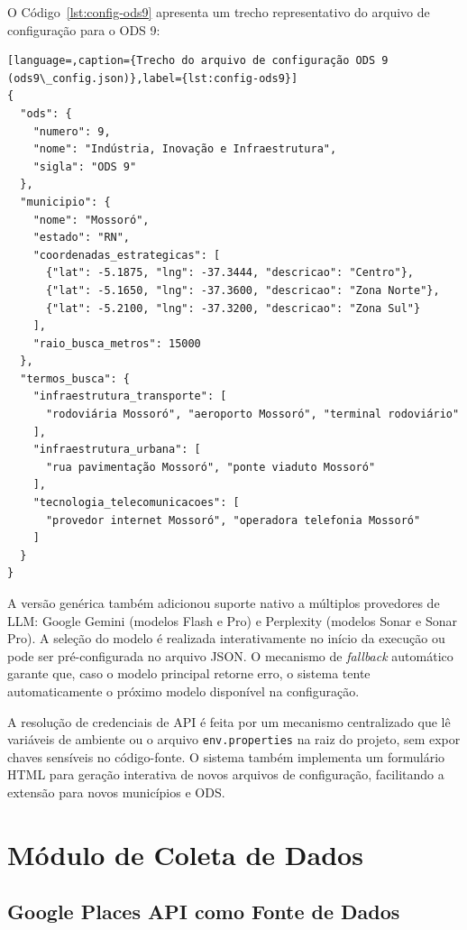 O Código~\ref{lst:config-ods9} apresenta um trecho representativo do arquivo de configuração para o ODS 9:

\begin{lstlisting}[language=,caption={Trecho do arquivo de configuração ODS 9 (ods9\_config.json)},label={lst:config-ods9}]
{
  "ods": {
    "numero": 9,
    "nome": "Indústria, Inovação e Infraestrutura",
    "sigla": "ODS 9"
  },
  "municipio": {
    "nome": "Mossoró",
    "estado": "RN",
    "coordenadas_estrategicas": [
      {"lat": -5.1875, "lng": -37.3444, "descricao": "Centro"},
      {"lat": -5.1650, "lng": -37.3600, "descricao": "Zona Norte"},
      {"lat": -5.2100, "lng": -37.3200, "descricao": "Zona Sul"}
    ],
    "raio_busca_metros": 15000
  },
  "termos_busca": {
    "infraestrutura_transporte": [
      "rodoviária Mossoró", "aeroporto Mossoró", "terminal rodoviário"
    ],
    "infraestrutura_urbana": [
      "rua pavimentação Mossoró", "ponte viaduto Mossoró"
    ],
    "tecnologia_telecomunicacoes": [
      "provedor internet Mossoró", "operadora telefonia Mossoró"
    ]
  }
}
\end{lstlisting}

A versão genérica também adicionou suporte nativo a múltiplos provedores de \gls{LLM}: Google Gemini (modelos Flash e Pro) e Perplexity (modelos Sonar e Sonar Pro). A seleção do modelo é realizada interativamente no início da execução ou pode ser pré-configurada no arquivo JSON. O mecanismo de \textit{fallback} automático garante que, caso o modelo principal retorne erro, o sistema tente automaticamente o próximo modelo disponível na configuração.

A resolução de credenciais de API é feita por um mecanismo centralizado que lê variáveis de ambiente ou o arquivo \texttt{env.properties} na raiz do projeto, sem expor chaves sensíveis no código-fonte. O sistema também implementa um formulário HTML para geração interativa de novos arquivos de configuração, facilitando a extensão para novos municípios e ODS.

\section{Módulo de Coleta de Dados}
\label{sec:coleta}

\subsection{Google Places API como Fonte de Dados}
\label{subsec:google-places}

